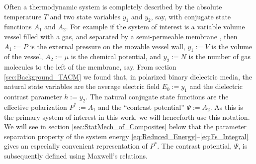 \documentclass[english,12pt]{ttuthes}
\begin{document}
Often a thermodynamic system is completely
described by the absolute temperature $T$ and two state variables
$y_1$ and $y_2$, say, with conjugate state functions $A_1$ and
$A_2$. For example if the system of interest is a variable volume
vessel filled with a gas, and separated by a semi-permeable membrane 
\cite{Thompson-1988,Robertson-1993}, then $A_1:=P$ is the external  
pressure on the movable vessel wall, $y_1:=V$ is the volume of the
vessel, $A_2:=\mu$ is the chemical potential, and $y_2:=N$ is the number
of gas molecules to the left of the membrane, say. From section
\ref{sec:Background_TACM} we found that, in polarized binary
dielectric media, the natural state variables are the average electric
field $E_0:=y_1$ and the dielectric contrast parameter $h:=y_2$. The natural
conjugate state functions are the effective polarization $P^*:=A_1$
and the ``contrast potential'' $\Psi:=A_2$. As this is the primary system
of interest in this work, we will henceforth use this notation. We
will see in section \ref{sec:StatMech_of_Composites} below that the
parameter separation property of the system energy
\eqref{eq:Reduced_Energy}--\eqref{eq:Fs_Integral} gives an especially 
convenient representation of $P^*$. The contrast potential, $\Psi$, is
subsequently defined using Maxwell's relations.
 
\end{document}
